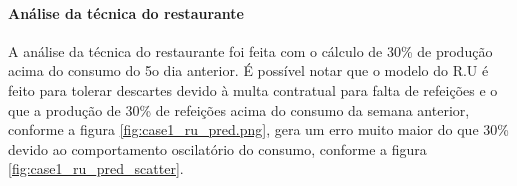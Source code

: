 \documentclass[	12pt, Times, openright, twoside, a4paper, english, brazil]{abntex2}
\begin{document}
    	    \paragraph{Análise da técnica do restaurante}
    	        A análise da técnica do restaurante foi feita com o cálculo de 30\% de produção acima do consumo do 5o dia anterior.
    	        É possível notar que o modelo do R.U é feito para tolerar descartes devido à multa contratual para falta de refeições e o que a produção de 30\% de refeições acima do consumo da semana anterior, conforme a figura  \ref{fig:case1_ru_pred.png}, gera um erro muito maior do que 30\% devido ao comportamento oscilatório do consumo, conforme a figura \ref{fig:case1_ru_pred_scatter}. 
    	         \begin{figure}[H]
                \end{figure}
                \begin{figure}[H]
                \end{figure}
\end{document}
